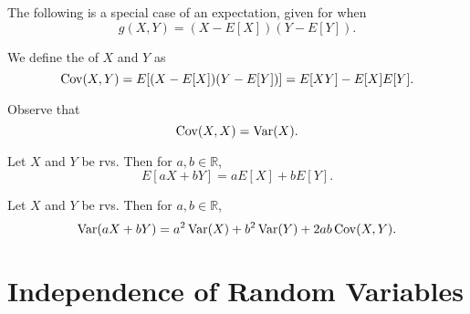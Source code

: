 \documentclass[notoc,notitlepage]{tufte-book}
\begin{document}
The following is a special case of an expectation, given for when
\begin{equation*}
  g(X, Y) = (X - E[X])(Y - E[Y]).
\end{equation*}

\begin{defn}\label{defn:covariance_of_joint_distributions}
  We define the  of $X$ and $Y$ as
  \begin{equation*}
    \operatorname{Cov}(X, Y) = E[(X - E[X])(Y - E[Y])] = E[XY] - E[X]E[Y].
  \end{equation*}
\end{defn}

\begin{note}
  Observe that
  \begin{equation*}
    \operatorname{Cov}(X, X) = \operatorname{Var}(X).
  \end{equation*}
\end{note}

\begin{propo}\label{propo:linearity_of_the_expectation_over_addition}
  Let $X$ and $Y$ be rvs. Then for $a, b \in \mathbb{R}$,
  \begin{equation*}
    E[aX + bY] = aE[X] + bE[Y].
  \end{equation*}
\end{propo}

\begin{propo}\label{propo:variance_over_a_linear_combination_of_rvs}
  Let $X$ and $Y$ be rvs. Then for $a, b \in \mathbb{R}$,
  \begin{equation*}
    \operatorname{Var}(aX + bY) = a^2 \operatorname{Var}(X) + b^2 \operatorname{Var}(Y) + 2ab \operatorname{Cov}(X, Y).
  \end{equation*}
\end{propo}



\section{Independence of Random Variables}%
\label{sec:independence_of_random_variables}
\end{document}
